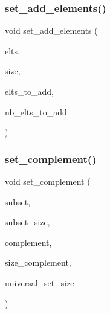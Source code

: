 \subsubsection{\texorpdfstring{set\+\_\+add\+\_\+elements()}{set\_add\_elements()}}
{\footnotesize\ttfamily void set\+\_\+add\+\_\+elements (\begin{DoxyParamCaption}\item[{\mbox{\hyperlink{galois_8h_a09fddde158a3a20bd2dcadb609de11dc}{I\+NT}} $\ast$}]{elts,  }\item[{\mbox{\hyperlink{galois_8h_a09fddde158a3a20bd2dcadb609de11dc}{I\+NT}} \&}]{size,  }\item[{\mbox{\hyperlink{galois_8h_a09fddde158a3a20bd2dcadb609de11dc}{I\+NT}} $\ast$}]{elts\+\_\+to\+\_\+add,  }\item[{\mbox{\hyperlink{galois_8h_a09fddde158a3a20bd2dcadb609de11dc}{I\+NT}}}]{nb\+\_\+elts\+\_\+to\+\_\+add }\end{DoxyParamCaption})}

\mbox{\label{combinatorics_8_c_ab7dc77f73fc69bb15dbec52aba503c3b}} 
\subsubsection{\texorpdfstring{set\+\_\+complement()}{set\_complement()}}
{\footnotesize\ttfamily void set\+\_\+complement (\begin{DoxyParamCaption}\item[{\mbox{\hyperlink{galois_8h_a09fddde158a3a20bd2dcadb609de11dc}{I\+NT}} $\ast$}]{subset,  }\item[{\mbox{\hyperlink{galois_8h_a09fddde158a3a20bd2dcadb609de11dc}{I\+NT}}}]{subset\+\_\+size,  }\item[{\mbox{\hyperlink{galois_8h_a09fddde158a3a20bd2dcadb609de11dc}{I\+NT}} $\ast$}]{complement,  }\item[{\mbox{\hyperlink{galois_8h_a09fddde158a3a20bd2dcadb609de11dc}{I\+NT}} \&}]{size\+\_\+complement,  }\item[{\mbox{\hyperlink{galois_8h_a09fddde158a3a20bd2dcadb609de11dc}{I\+NT}}}]{universal\+\_\+set\+\_\+size }\end{DoxyParamCaption})}

\mbox{\label{combinatorics_8_c_a4ddab5f8fd4385642059e27de2e9b465}} 
